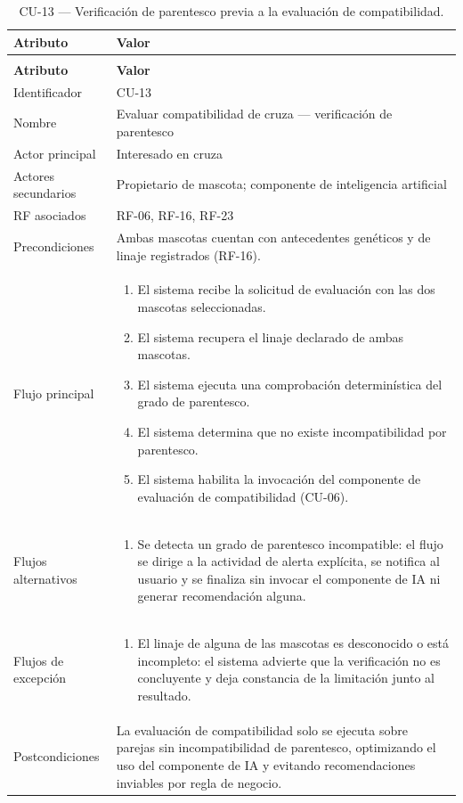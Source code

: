 \documentclass[journal,onecolumn]{IEEEtran}
\makeatletter
\newenvironment{atributos}[2]{%
	\small
	\begin{longtable}{@{}>{\raggedright\arraybackslash}p{4.2cm} >{\raggedright\arraybackslash}p{11.2cm}@{}}
		\caption{#2}\label{tab:#1}\\
		\toprule
		\textbf{Atributo} & \textbf{Valor} \\
		\midrule
		\endfirsthead
		\multicolumn{2}{@{}l}{\small\itshape (continuación)}\\
		\toprule
		\textbf{Atributo} & \textbf{Valor} \\
		\midrule
		\endhead
		\bottomrule
		\endlastfoot
	}{%
	\end{longtable}
	\normalsize
}
\makeatother
\begin{document}
	\begin{atributos}{CU-13}{CU-13 --- Verificación de parentesco previa a la evaluación de compatibilidad.}
		Identificador & CU-13 \\
		Nombre & Evaluar compatibilidad de cruza --- verificación de parentesco \\
		Actor principal & Interesado en cruza \\
		Actores secundarios & Propietario de mascota; componente de inteligencia artificial \\
		RF asociados & RF-06, RF-16, RF-23 \\
		Precondiciones & Ambas mascotas cuentan con antecedentes genéticos y de linaje registrados (RF-16). \\
		Flujo principal &
		\begin{enumerate}[leftmargin=*, nosep]
			\item El sistema recibe la solicitud de evaluación con las dos mascotas seleccionadas.
			\item El sistema recupera el linaje declarado de ambas mascotas.
			\item El sistema ejecuta una comprobación determinística del grado de parentesco.
			\item El sistema determina que no existe incompatibilidad por parentesco.
			\item El sistema habilita la invocación del componente de evaluación de compatibilidad (CU-06).
		\end{enumerate} \\
		Flujos alternativos &
		\begin{enumerate}[leftmargin=*, nosep]
			\item[3.1] Se detecta un grado de parentesco incompatible: el flujo se dirige a la actividad de alerta explícita, se notifica al usuario y se finaliza sin invocar el componente de IA ni generar recomendación alguna.
		\end{enumerate} \\
		Flujos de excepción &
		\begin{enumerate}[leftmargin=*, nosep]
			\item[2.1] El linaje de alguna de las mascotas es desconocido o está incompleto: el sistema advierte que la verificación no es concluyente y deja constancia de la limitación junto al resultado.
		\end{enumerate} \\
		Postcondiciones & La evaluación de compatibilidad solo se ejecuta sobre parejas sin incompatibilidad de parentesco, optimizando el uso del componente de IA y evitando recomendaciones inviables por regla de negocio. \\
	\end{atributos}
	
\end{document}
